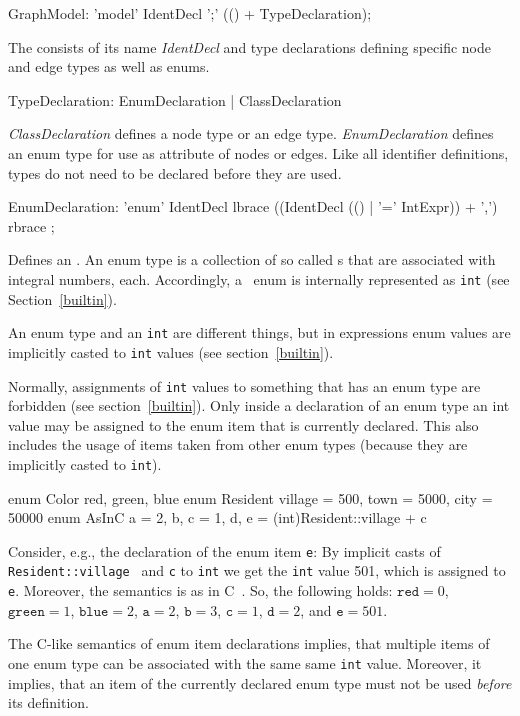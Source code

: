 \begin{rail}
  GraphModel: 'model' IdentDecl ';' (() + TypeDeclaration);
\end{rail}
The  consists of its name \emph{IdentDecl} and type declarations defining specific node and edge types as well as enums.

\begin{rail}
  TypeDeclaration: EnumDeclaration | ClassDeclaration
\end{rail}
\emph{ClassDeclaration} defines a node type or an edge type. \emph{EnumDeclaration} defines an enum type for use as attribute of nodes or edges. Like all identifier definitions, types do not need to be declared before they are used.

\begin{rail}
  EnumDeclaration: 'enum' IdentDecl lbrace ((IdentDecl (() | '=' IntExpr)) + ',') rbrace ;
\end{rail}
Defines an .
An enum type is a collection of so called s that are associated with integral numbers, each.
Accordingly, a \GrG\ enum is internally represented as \texttt{int} (see Section~\ref{builtin}).
\begin{note}
	An enum type and an {\tt int} are different things, but in expressions enum values are implicitly casted to {\tt int} values 	(see section~\ref{builtin}).
\end{note}
\begin{note}
	Normally, assignments of {\tt int} values to something that has an enum type are forbidden (see section~\ref{builtin}).
	Only inside a declaration of an enum type an int value may be assigned to the enum item that is currently declared.
	This also includes the usage of items taken from other enum types (because they are implicitly casted to {\tt int}).
\end{note}

\begin{example}
\begin{grgen}
enum Color {red, green, blue}
enum Resident {village = 500, town = 5000, city = 50000}
enum AsInC {a = 2, b, c = 1, d, e = (int)Resident::village + c}
\end{grgen}
Consider, e.g., the declaration of the enum item {\tt e}:
By implicit casts of   {\tt Resident::village } and {\tt c} to {\tt int} we get the {\tt int} value 501, which is assigned to {\tt e}.
Moreover, the semantics is as in C~\cite{Sch:1990:ANSIC}. So, the following holds: $\texttt{red} = 0$, $\texttt{green} = 1$, $\texttt{blue} = 2$, $\texttt{a}=2$, $\texttt{b}=3$, $\texttt{c}=1$, $\texttt{d}=2$, and $\texttt{e}=501$.
\end{example}
\begin{note}
	The C-like semantics of enum item declarations implies, that multiple items of one enum type can be associated with the same same {\tt int} value.
	Moreover, it implies, that an item of the currently declared enum type must not be used \emph{before} its definition.
\end{note}

